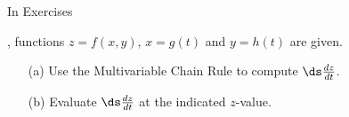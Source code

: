 {\noindent In Exercises} 
{,  functions $z=f(x,y)$, $x=g(t)$ and $y=h(t)$ are given.
\begin{enumerate}
	\item[(a)] Use the Multivariable Chain Rule to compute $\ds \frac{dz}{dt}$.
	\item[(b)] Evaluate $\ds \frac{dz}{dt}$ at the indicated $z$-value.
\end{enumerate}
}
